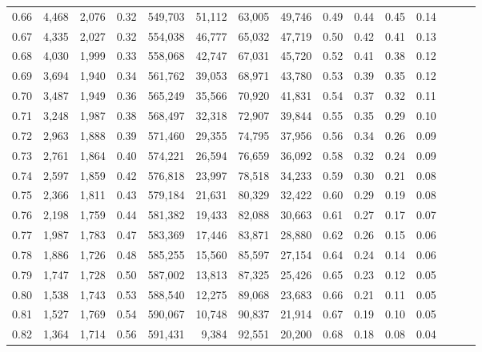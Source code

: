 \begin{tabular}{rrrrrrrrrrrrrrr}
0.66 &   4,468 &  2,076 &  0.32 &  549,703 &   51,112 &   63,005 &   49,746 &  0.49 &  0.44 &  0.45 &      0.14 \\
0.67 &   4,335 &  2,027 &  0.32 &  554,038 &   46,777 &   65,032 &   47,719 &  0.50 &  0.42 &  0.41 &      0.13 \\
0.68 &   4,030 &  1,999 &  0.33 &  558,068 &   42,747 &   67,031 &   45,720 &  0.52 &  0.41 &  0.38 &      0.12 \\
0.69 &   3,694 &  1,940 &  0.34 &  561,762 &   39,053 &   68,971 &   43,780 &  0.53 &  0.39 &  0.35 &      0.12 \\
0.70 &   3,487 &  1,949 &  0.36 &  565,249 &   35,566 &   70,920 &   41,831 &  0.54 &  0.37 &  0.32 &      0.11 \\
0.71 &   3,248 &  1,987 &  0.38 &  568,497 &   32,318 &   72,907 &   39,844 &  0.55 &  0.35 &  0.29 &      0.10 \\
0.72 &   2,963 &  1,888 &  0.39 &  571,460 &   29,355 &   74,795 &   37,956 &  0.56 &  0.34 &  0.26 &      0.09 \\
0.73 &   2,761 &  1,864 &  0.40 &  574,221 &   26,594 &   76,659 &   36,092 &  0.58 &  0.32 &  0.24 &      0.09 \\
0.74 &   2,597 &  1,859 &  0.42 &  576,818 &   23,997 &   78,518 &   34,233 &  0.59 &  0.30 &  0.21 &      0.08 \\
0.75 &   2,366 &  1,811 &  0.43 &  579,184 &   21,631 &   80,329 &   32,422 &  0.60 &  0.29 &  0.19 &      0.08 \\
0.76 &   2,198 &  1,759 &  0.44 &  581,382 &   19,433 &   82,088 &   30,663 &  0.61 &  0.27 &  0.17 &      0.07 \\
0.77 &   1,987 &  1,783 &  0.47 &  583,369 &   17,446 &   83,871 &   28,880 &  0.62 &  0.26 &  0.15 &      0.06 \\
0.78 &   1,886 &  1,726 &  0.48 &  585,255 &   15,560 &   85,597 &   27,154 &  0.64 &  0.24 &  0.14 &      0.06 \\
0.79 &   1,747 &  1,728 &  0.50 &  587,002 &   13,813 &   87,325 &   25,426 &  0.65 &  0.23 &  0.12 &      0.05 \\
0.80 &   1,538 &  1,743 &  0.53 &  588,540 &   12,275 &   89,068 &   23,683 &  0.66 &  0.21 &  0.11 &      0.05 \\
0.81 &   1,527 &  1,769 &  0.54 &  590,067 &   10,748 &   90,837 &   21,914 &  0.67 &  0.19 &  0.10 &      0.05 \\
0.82 &   1,364 &  1,714 &  0.56 &  591,431 &    9,384 &   92,551 &   20,200 &  0.68 &  0.18 &  0.08 &      0.04 \\

\end{tabular}
